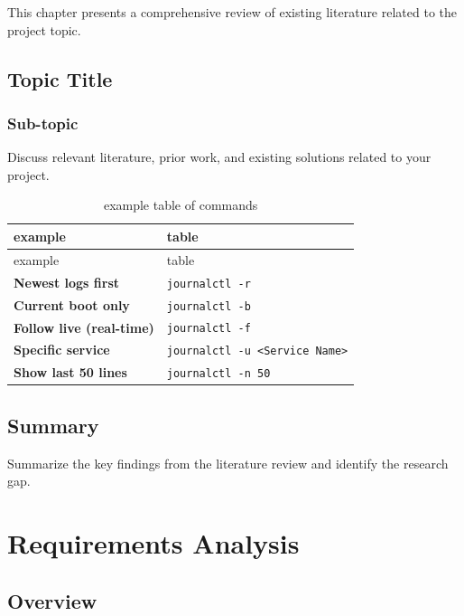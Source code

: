 \documentclass[
]{fypStandard}
\begin{document}
This chapter presents a comprehensive review of existing literature
related to the project topic.

\section{Topic Title}\label{topic-title}

\subsection{Sub-topic}\label{sub-topic}

Discuss relevant literature, prior work, and existing solutions related
to your project.

\begin{longtable}[]{@{}ll@{}}
\caption{example table of commands}\tabularnewline
\toprule\noalign{}
example & table \\
\midrule\noalign{}
\endfirsthead
\toprule\noalign{}
example & table \\
\midrule\noalign{}
\endhead
\bottomrule\noalign{}
\endlastfoot
\textbf{Newest logs first} & \texttt{journalctl\ -r} \\
\textbf{Current boot only} & \texttt{journalctl\ -b} \\
\textbf{Follow live (real-time)} & \texttt{journalctl\ -f} \\
\textbf{Specific service} &
\texttt{journalctl\ -u\ \textless{}Service\ Name\textgreater{}} \\
\textbf{Show last 50 lines} & \texttt{journalctl\ -n\ 50} \\
\end{longtable}

\section{Summary}\label{summary-1}

Summarize the key findings from the literature review and identify the
research gap.

\chapter{Requirements Analysis}\label{requirements-analysis}

\section{Overview}\label{overview-2}
\end{document}
